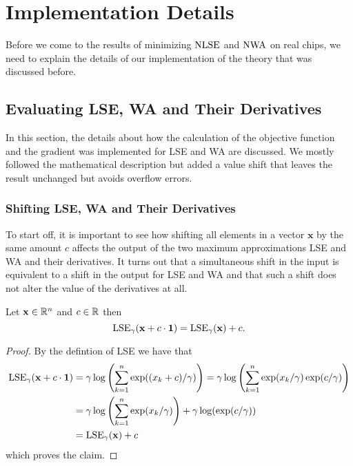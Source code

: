 \chapter{Implementation Details} \label{chap:implementation_details}

Before we come to the results of minimizing \(\operatorname{NLSE}\) and \(\operatorname{NWA}\) on real chips,
we need to explain the details of our implementation of the theory that was discussed before.


\section{Evaluating LSE, WA and Their Derivatives} \label{sec:evaluating_LSE_and_WA}

In this section, the details about how the calculation of the objective function and the gradient was implemented for LSE and WA are discussed.
We mostly followed the mathematical description but added a value shift that leaves the result unchanged but avoids overflow errors.



\subsection{Shifting LSE, WA and Their Derivatives} \label{sec:shifting_LSE_and_WA}

To start off, it is important to see how shifting all elements in a vector \(\mathbf{x}\) by the same amount \(c\) affects
the output of the two maximum approximations LSE and WA and their derivatives.
It turns out that a simultaneous shift in the input is equivalent to a shift in the output for LSE and WA and
that such a shift does not alter the value of the derivatives at all.

\begin{lemma} \label{thm:shifting_LSE}
 Let \(\mathbf{x} \in \mathbb{R}^n\) and \(c \in \mathbb{R}\) then
 \[ \operatorname{LSE}_\gamma(\mathbf{x} + c \cdot \mathbf{1}) = \operatorname{LSE}_\gamma(\mathbf{x}) + c . \]
\end{lemma}

\begin{proof}
 By the defintion of LSE we have that
 \begin{align*}
     \operatorname{LSE}_\gamma(\mathbf{x} + c \cdot \mathbf{1})
  &= \gamma \log \left({\sum_{k = 1}^n \exp((x_k + c)/\gamma)}\right)
   = \gamma \log \left({\sum_{k = 1}^n \exp(x_k/\gamma)\exp(c/\gamma)}\right) \\
  &= \gamma \log \left({\sum_{k = 1}^n \exp(x_k/\gamma)}\right) + \gamma \log(\exp(c/\gamma)) \\
  &= \operatorname{LSE}_\gamma(\mathbf{x}) + c
 \end{align*}
 which proves the claim.
\end{proof}

